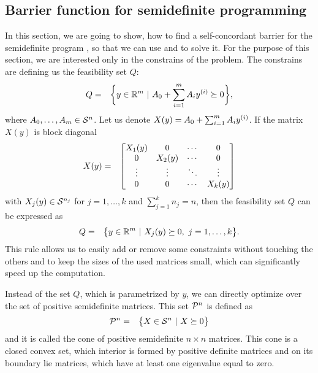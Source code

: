 \subsection{Barrier function for semidefinite programming}
In this section, we are going to show, how to find a self-concordant barrier for the semidefinite program , so that we can use  and  to solve it.
For the purpose of this section, we are interested only in the constrains of the problem.
The constrains are defining us the feasibility set $Q$:
\begin{eqnarray}
  Q &=& \bigg\{y\in\mathbb{R}^m\ |\ A_0 + \sum_{i=1}^mA_iy^{(i)} \succeq 0\bigg\},
\end{eqnarray}
where $A_0, \ldots, A_m \in\mathcal{S}^n$.
Let us denote $X(y) = A_0 + \sum_{i=1}^mA_iy^{(i)}$.
If the matrix $X(y)$ is block diagonal
\begin{eqnarray}
  X(y) &=& \begin{bmatrix}
          X_1(y) & 0      & \cdots & 0      \\
          0      & X_2(y) & \cdots & 0      \\
          \vdots & \vdots & \ddots & \vdots \\
          0      & 0      & \cdots & X_k(y)
        \end{bmatrix} \labeleq{SDP:bf:bd}
\end{eqnarray}
with $X_j(y)\in\mathcal{S}^{n_j}$ for $j = 1, \ldots, k$ and $\sum_{j=1}^k n_j = n$, then the feasibility set $Q$ can be expressed as
\begin{eqnarray}
  Q &=& \big\{y\in\mathbb{R}^m\ |\ X_j(y) \succeq 0,\ j = 1,\ldots, k\big\}.
\end{eqnarray}
This rule allows us to easily add or remove some constraints without touching the others and to keep the sizes of the used matrices small, which can significantly speed up the computation.

Instead of the set $Q$, which is parametrized by $y$, we can directly optimize over the set of positive semidefinite matrices. This set $\mathcal{P}^n$ is defined as
\begin{eqnarray}
  \mathcal{P}^n &=& \big\{X\in\mathcal{S}^n\ |\ X\succeq0\big\}
\end{eqnarray}
and it is called the cone of positive semidefinite $n\times n$ matrices. This cone is a closed convex set, which interior is formed by positive definite matrices and on its boundary lie matrices, which have at least one eigenvalue equal to zero.

